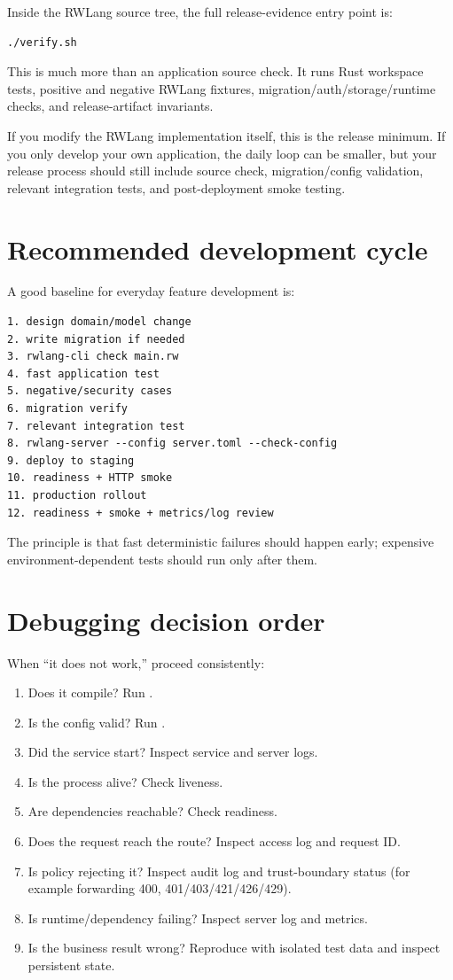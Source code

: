Inside the RWLang source tree, the full release-evidence entry point is:

\begin{lstlisting}
./verify.sh
\end{lstlisting}

This is much more than an application source check. It runs Rust workspace tests, positive and negative RWLang fixtures, migration/auth/storage/runtime checks, and release-artifact invariants.

If you modify the RWLang implementation itself, this is the release minimum. If you only develop your own  application, the daily loop can be smaller, but your release process should still include source check, migration/config validation, relevant integration tests, and post-deployment smoke testing.

\section{Recommended development cycle}

A good baseline for everyday feature development is:

\begin{lstlisting}
1. design domain/model change
2. write migration if needed
3. rwlang-cli check main.rw
4. fast application test
5. negative/security cases
6. migration verify
7. relevant integration test
8. rwlang-server --config server.toml --check-config
9. deploy to staging
10. readiness + HTTP smoke
11. production rollout
12. readiness + smoke + metrics/log review
\end{lstlisting}

The principle is that fast deterministic failures should happen early; expensive environment-dependent tests should run only after them.

\section{Debugging decision order}

When ``it does not work,'' proceed consistently:

\begin{enumerate}
  \item Does it compile? Run .
  \item Is the config valid? Run .
  \item Did the service start? Inspect service and server logs.
  \item Is the process alive? Check liveness.
  \item Are dependencies reachable? Check readiness.
  \item Does the request reach the route? Inspect access log and request ID.
  \item Is policy rejecting it? Inspect audit log and trust-boundary status (for example forwarding 400, 401/403/421/426/429).
  \item Is runtime/dependency failing? Inspect server log and metrics.
  \item Is the business result wrong? Reproduce with isolated test data and inspect persistent state.
\end{enumerate}

